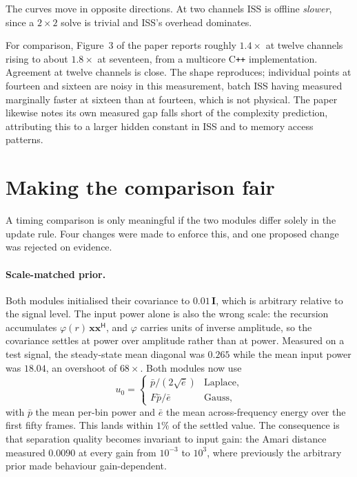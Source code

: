 \documentclass[11pt,a4paper]{article}
\newcommand{\x}{\boldsymbol{x}}
\newcommand{\herm}{^{\mathsf{H}}}
\begin{document}
The curves move in opposite directions. At two channels ISS is offline
\emph{slower}, since a $2\times2$ solve is trivial and ISS's overhead dominates.

For comparison, Figure~3 of the paper reports roughly $1.4\times$ at twelve
channels rising to about $1.8\times$ at seventeen, from a multicore C\texttt{++}
implementation. Agreement at twelve channels is close. The shape reproduces;
individual points at fourteen and sixteen are noisy in this measurement, batch
ISS having measured marginally faster at sixteen than at fourteen, which is not
physical. The paper likewise notes its own measured gap falls short of the
complexity prediction, attributing this to a larger hidden constant in ISS and to
memory access patterns.


\section{Making the comparison fair}
\label{sec:fairness}

A timing comparison is only meaningful if the two modules differ solely in the
update rule. Four changes were made to enforce this, and one proposed change was
rejected on evidence.

\paragraph{Scale-matched prior.} Both modules initialised their covariance to
$0.01\,\boldsymbol{I}$, which is arbitrary relative to the signal level. The
input power alone is also the wrong scale: the recursion accumulates
$\varphi(r)\,\x\x\herm$, and $\varphi$ carries units of inverse amplitude, so the
covariance settles at power over amplitude rather than at power. Measured on a
test signal, the steady-state mean diagonal was $0.265$ while the mean input
power was $18.04$, an overshoot of $68\times$. Both modules now use
%
\begin{equation}
u_0 =
\begin{cases}
\bar{p} \big/ \left(2\sqrt{\bar{e}}\right) & \text{Laplace},\\[0.4em]
F\bar{p} \big/ \bar{e} & \text{Gauss},
\end{cases}
\end{equation}
%
with $\bar{p}$ the mean per-bin power and $\bar{e}$ the mean across-frequency
energy over the first fifty frames. This lands within $1\%$ of the settled
value. The consequence is that separation quality becomes invariant to input
gain: the Amari distance measured $0.0090$ at every gain from $10^{-3}$ to
$10^{3}$, where previously the arbitrary prior made behaviour gain-dependent.
\end{document}
